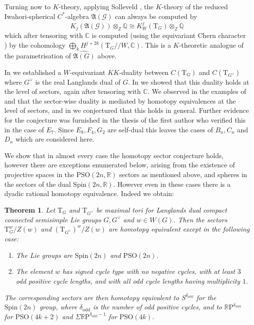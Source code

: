 \documentclass[11pt,a4paper]{article}
\newtheorem{theorem}{Theorem}
\def\Spin{\mathrm{Spin}}
\def\PSO{\mathrm{PSO}}
\def\fA{\mathfrak{A}}
\def\R{\mathbb{R}}
\def\Z{\mathbb{Z}}
\def\Q{\mathbb{Q}}
\def\fA{\mathfrak{A}}
\def\RP{\R\mathrm{P}}
\newcommand{\C}{\mathbb{C}}
\def\q {{/\!/}}
\def\odd{\mathrm{odd}}
\def\bT{\mathrm{T}}
\def\G{\mathcal{G}}
\begin{document}
Turning now to $K$-theory, applying Solleveld \cite[Eq. 4.9]{ABPS2}, the $K$-theory of the reduced Iwahori-spherical $C^*$-algebra $\fA(\G)$ can always be computed by
\[
K_j(\fA(\G)) \otimes_\Z \Q \cong K^j_W(\bT_G) \otimes_\Z \Q
\]
which after tensoring with $\C$ is computed (using the equivariant Chern character \cite{BaumConneschern}) by the cohomology $\bigoplus_k H^{j+2k}(\bT_G\q W,\C)$. This is a $K$-theoretic analogue of the parametrisation of $\widehat{\fA(G)}$ above.

In \cite{NPWKdual} we established a $W$-equivariant $KK$-duality between $C(\bT_G)$ and $C(\bT_{G^\vee})$ where $G^\vee$ is the real Langlands dual of $G$. In \cite{NPWAn} we showed that this duality holds at the level of sectors, again after tensoring with $\C$. We observed in the examples of \cite{NPWAn} and \cite{NPWE6} that the sector-wise duality is mediated by homotopy equivalences at the level of sectors, and in \cite{NPWE6} we conjectured that this holds in general. Further evidence for the conjecture was furnished in the thesis of the first author \cite{Majda} who verified this in the case of $E_7$. Since $E_8,F_4,G_2$ are self-dual this leaves the cases of $B_n,C_n$ and $D_n$ which are considered here.



We show that in almost every case the homotopy sector conjecture holds, however there are exceptions enumerated below, arising from the existence of projective spaces in the $\PSO(2n,\R)$ sectors as mentioned above, and spheres in the sectors of the dual $\Spin(2n,\R)$. However even in these cases there is a dyadic rational homotopy equivalence. Indeed we obtain:
\begin{theorem}\label{theorem}
    Let $\bT_G$ and $\bT_{G^\vee}$ be maximal tori for Langlands dual compact connected semisimple Lie groups ${G}, {G}^\vee$ and $w\in W({G})$. Then the sectors $\bT_G^w/Z(w)$ and $(\bT_{G^\vee})^w/Z(w)$ are homotopy equivalent except in the following case:
    \begin{enumerate}
        \item The Lie groups are $\Spin(2n)$ and $\PSO(2n)$.
        \item The element $w$ has signed cycle type with no negative cycles, with at least $3$ odd positive cycle lengths, and with all odd cycle lengths having multiplicity $1$.
    \end{enumerate}


    The corresponding sectors are then homotopy equivalent to $S^{\delta_\odd}$  for the $\Spin(2n)$ group, where ${\delta_\odd}$ is the number of odd positive cycles,  and to $\RP^{\delta_\odd}$ for $\PSO(4k+2)$ and $\Sigma \RP^{\delta_\odd-1}$ for  $\PSO(4k)$.
\end{theorem}
\end{document}
